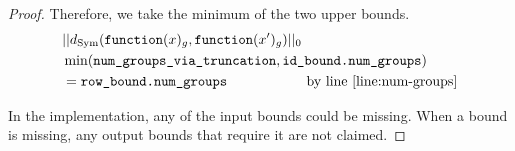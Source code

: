 \documentclass{article}
\begin{document}
\begin{proof}
    Therefore, we take the minimum of the two upper bounds.
    \begin{align*}
        &||d_{\mathrm{Sym}}(\texttt{function}(x)_{g}, \texttt{function}(x')_{g})||_0 \\
        &\min(\texttt{num\_groups\_via\_truncation}, \texttt{id\_bound.num\_groups}) \\
        &= \texttt{row\_bound.num\_groups} \hspace{2cm} \text{by line } \ref{line:num-groups}
    \end{align*}

    In the implementation, any of the input bounds could be missing.
    When a bound is missing, any output bounds that require it are not claimed.
\end{proof}
\end{document}
